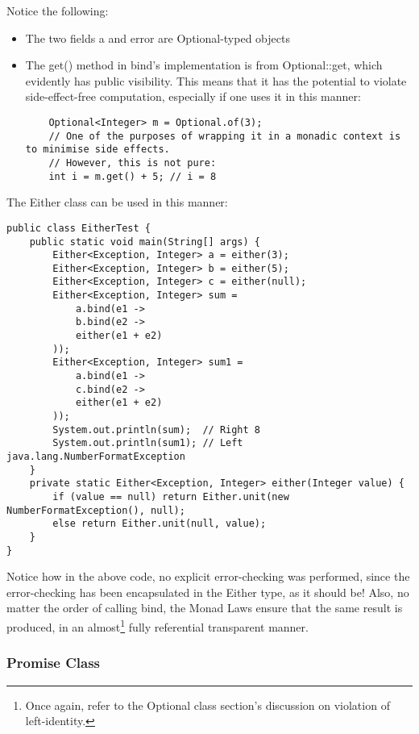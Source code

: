 Notice the following:
\begin{itemize}
    \item The two fields a and error are Optional-typed objects 
    \item The get() method in bind's implementation is from Optional::get, which evidently has public visibility. This means that it has the potential to violate side-effect-free computation, especially if one uses it in this manner:
    \begin{verbatim}
    Optional<Integer> m = Optional.of(3);
    // One of the purposes of wrapping it in a monadic context is to minimise side effects.
    // However, this is not pure:
    int i = m.get() + 5; // i = 8
    \end{verbatim}
\end{itemize}

The Either class can be used in this manner:

\begin{verbatim}
public class EitherTest {
    public static void main(String[] args) {
        Either<Exception, Integer> a = either(3);
        Either<Exception, Integer> b = either(5);
        Either<Exception, Integer> c = either(null);
        Either<Exception, Integer> sum = 
            a.bind(e1 -> 
            b.bind(e2 -> 
            either(e1 + e2)
        ));
        Either<Exception, Integer> sum1 = 
            a.bind(e1 -> 
            c.bind(e2 -> 
            either(e1 + e2)
        ));
        System.out.println(sum);  // Right 8
        System.out.println(sum1); // Left java.lang.NumberFormatException
    }
    private static Either<Exception, Integer> either(Integer value) {
        if (value == null) return Either.unit(new NumberFormatException(), null);
        else return Either.unit(null, value);
    }
}
\end{verbatim}

Notice how in the above code, no explicit error-checking was performed, since the error-checking has been encapsulated in the Either type, as it should be! Also, no matter the order of calling bind, the Monad Laws ensure that the same result is produced, in an almost\footnote{Once again, refer to the Optional class section's discussion on violation of left-identity.} fully referential transparent manner.

\subsubsection{Promise Class}
\label{sec:9}

